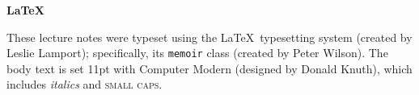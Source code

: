 \documentclass[../main]{subfiles}
\begin{document}
\thispagestyle{empty}
\vspace*{\fill}
\centering
\begin{minipage}{0.75\textwidth}
  \centering
  {\LARGE \textbf{\LaTeX}}

  These lecture notes were typeset using the \LaTeX\ typesetting system
  (created by Leslie Lamport); specifically, its \texttt{memoir} class
  (created by Peter Wilson). The body text is set 11pt with Computer Modern
  (designed by Donald Knuth), which includes \textit{italics} and \textsc{small caps.}
\end{minipage}
\vfill
\end{document}
